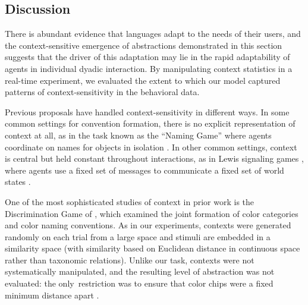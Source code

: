 %

\subsection{Discussion}

There is abundant evidence that languages adapt to the needs of their users, and the context-sensitive emergence of abstractions demonstrated in this section suggests that the driver of this adaptation may lie in the rapid adaptability of agents in individual dyadic interaction. 
By manipulating context statistics in a real-time experiment, we evaluated the extent to which our model captured patterns of context-sensitivity in the behavioral data.

Previous proposals have handled context-sensitivity in different ways.
In some common settings for convention formation, there is no explicit representation of context at all, as in the task known as the ``Naming Game'' where agents coordinate on names for objects in isolation \cite{steels2012experiments,baronchelli2008depth}. 
In other common settings, context is central but held constant throughout interactions, as in Lewis signaling games \cite{lewis_convention:_1969}, where agents use a fixed set of messages to communicate a fixed set of world states \cite{skyrms2010signals,BrunerEtAl14_LewisConventions}.

One of the most sophisticated studies of context in prior work is the Discrimination Game of , which examined the joint formation of color categories and color naming conventions.
As in our experiments, contexts were generated randomly on each trial from a large space and stimuli are embedded in a similarity space (with similarity based on Euclidean distance in continuous space rather than taxonomic relations).
Unlike our task, contexts were not systematically manipulated, and the resulting level of abstraction was not evaluated: the only restriction was to ensure that color chips were a fixed minimum distance apart  \cite<see also>[which found that imposing a realistic Just Noticeable Difference function as the minimum distance on communicative contexts leads to human-like color naming systems]{baronchelli2010modeling}.

